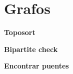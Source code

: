 \section{Grafos}
%    

    \textbf{Toposort}
    

    \textbf{Bipartite check}
    

    \textbf{Encontrar puentes}
    